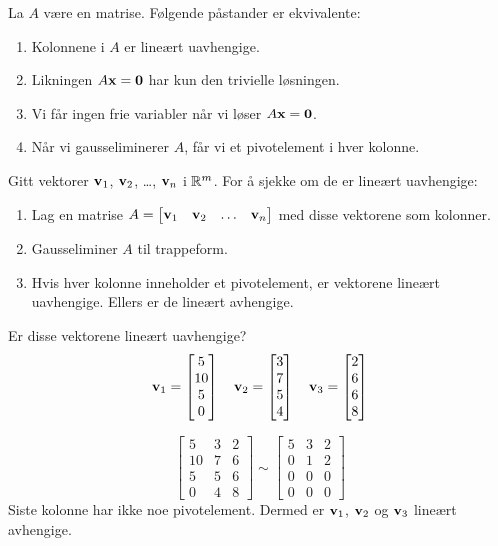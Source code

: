 \begin{thm}
\label{thm:linuavh}
La $A$ være en matrise.  Følgende påstander er ekvivalente:
\begin{enumerate}
\item Kolonnene i $A$ er lineært uavhengige.
\item Likningen $A \mathbf{x} = \mathbf{0}$ har kun den trivielle løsningen.
\item Vi får ingen frie variabler når vi løser $A \mathbf{x} = \mathbf{0}$.
\item Når vi gausseliminerer $A$, får vi et pivotelement i hver kolonne.
\end{enumerate}
\end{thm}

Gitt vektorer $\mathbf{v}_1$, $\mathbf{v}_2$, \ldots, $\mathbf{v}_n$ i $\mathbb{R}^m$.  For å
sjekke om de er lineært uavhengige:
\begin{enumerate}
\item Lag en matrise
$A = \begin{bmatrix} \mathbf{v}_1 & \mathbf{v}_2 & \ldots &
\mathbf{v}_n \end{bmatrix}$ med disse vektorene som kolonner.
\item Gausseliminer $A$ til trappeform.
\item Hvis hver kolonne inneholder et pivotelement, er vektorene lineært uavhengige.
Ellers er de lineært avhengige.
\end{enumerate}


\begin{ex}
Er disse vektorene lineært uavhengige?
\[
\mathbf{v}_1 = \begin{bmatrix} 5 \\ 10 \\ 5 \\ 0 \end{bmatrix}\quad
\mathbf{v}_2 = \begin{bmatrix} 3 \\ 7 \\ 5 \\ 4 \end{bmatrix}\quad
\mathbf{v}_3 = \begin{bmatrix} 2 \\ 6 \\ 6 \\ 8 \end{bmatrix}
\]

\[
\begin{bmatrix}
5 & 3 & 2 \\
10 & 7 & 6 \\
5 & 5 & 6 \\
0 & 4 & 8
\end{bmatrix}
\sim
\begin{bmatrix}
5 & 3 & 2 \\
0 & 1 & 2 \\
0 & 0 & 0 \\
0 & 0 & 0
\end{bmatrix}
\]
Siste kolonne har ikke noe pivotelement.  Dermed er $\mathbf{v}_1$,
$\mathbf{v}_2$ og $\mathbf{v}_3$ lineært avhengige.
\end{ex}


